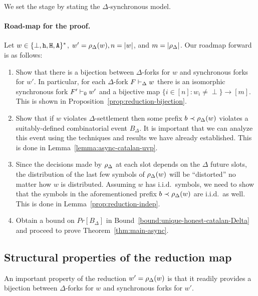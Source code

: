 We set the stage by stating the $\Delta$-synchronous model.



\paragraph{Road-map for the proof.}
Let $w \in \{\perp, \mathtt{h}, \mathtt{H}, \mathtt{A}\}^*$, 
$w' = \rho_\Delta(w), n = |w|$, and $m = |\rho_\Delta|$. 
Our roadmap forward is as follows:
\begin{enumerate}
  \item 
  Show that there is a bijection between 
  $\Delta$-forks for $w$ and 
  synchronous forks for $w'$. 
  In particular, for each $\Delta$-fork $F \vdash_\Delta w$ 
  there is an isomorphic synchronous fork $F' \vdash_0 w'$ 
  and a bijective map $\{i \in [n] : w_i \neq \perp\} \rightarrow [m]$. 
  This is shown in Proposition~\ref{prop:reduction-bijection}.

  \item Show that if $w$ violates $\Delta$-settlement 
  then some prefix $b \prec \rho_\Delta(w)$ violates 
  a suitably-defined combinatorial event $B_\Delta$.   
  It is important that we can analyze this event 
  using the techniques and results we have already established.
  This is done in Lemma~\ref{lemma:async-catalan-uvp}.

  \item Since the decisions made by $\rho_\Delta$ at each slot 
  depends on the $\Delta$ future slots, 
  the distribution of the last few symbols of $\rho_\Delta(w)$ 
  will be ``distorted'' no matter how $w$ is distributed. 
  Assuming $w$ has i.i.d.\ symbols, we need to 
  show that the symbols 
  in the aforementioned prefix $b \prec \rho_\Delta(w)$ 
  are i.i.d.\ as well. 
  This is done in Lemma~\ref{prop:reduction-indep}.

  \item Obtain a bound on $Pr[B_\Delta]$ in Bound~\ref{bound:unique-honest-catalan-Delta} and 
  proceed to prove Theorem~\ref{thm:main-async}.
\end{enumerate}



\subsection{Structural properties of the reduction map}
An important property of the reduction $w' = \rho_\Delta(w)$ is that 
it readily provides a bijection between $\Delta$-forks for $w$ 
and synchronous forks for $w'$.

